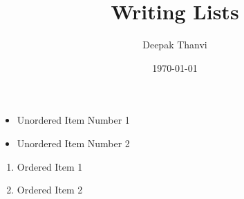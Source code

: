 \documentclass{article}
\title{Writing Lists}
\author{Deepak Thanvi}
\date{\today}
\begin{document}
\maketitle


\begin{itemize}
	
	\item Unordered Item Number 1
	\item Unordered Item Number 2

\end{itemize}


\begin{enumerate}

	\item Ordered Item 1
	\item Ordered Item 2

\end{enumerate}
\end{document}

